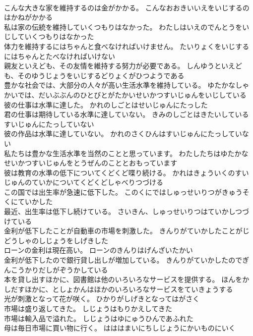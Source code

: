 \documentclass[8pt]{extreport}
\begin{document}
\begin{CJK}{UTF8}{min}
\\	こんな大きな家を維持するのは金がかかる。	こんなおおきいいえをいじするのはかねがかかる 
\\	私は家の伝統を維持していくつもりはなかった。	わたしはいえのでんとうをいじしていくつもりはなかった 
\\	体力を維持するにはちゃんと食べなければいけません。	たいりょくをいじするにはちゃんとたべなければいけない 
\\	親友といえども、その友情を維持する努力が必要である。	しんゆうといえども、そのゆうじょうをいじするどりょくがひつようである 
\\	豊かな社会では、大部分の人々が高い生活水準を維持している。	ゆたかなしゃかいでは、だいぶぶんのひとびとがたかいせいかつすいじゅんをいじしている 
\\	彼の仕事は水準に達した。	かれのしごとはせいじゅんにたっした 
\\	君の仕事は期待している水準に達していない。	きみのしごとはきたいしているすいじゅんにたっしていない 
\\	彼の作品は水準に達していない。	かれのさくひんはすいじゅんにたっしていない 
\\	私たちは豊かな生活水準を当然のことと思っています。	わたしたちはゆたかなせいかつすいじゅんをとうぜんのこととおもっています 
\\	彼は教育の水準の低下についてくどくど喋り続ける。	かれはきょういくのすいじゅんのていかについてくどくどしゃべりつづける 
\\	この国では出生率が急速に低下した。	このくにではしゅっせいりつがきゅうそくにていかした 
\\	最近、出生率は低下し続けている。	さいきん、しゅっせいりつはていかしつづけている 
\\	金利が低下したことが自動車の市場を刺激した。	きんりがていかしたことがじどうしゃのしじょうをしげきした 
\\	ローンの金利は現在高い。	ローンのきんりはげんざいたかい 
\\	金利が低下したので銀行貸し出しが増加している。	きんりがていかしたのでぎんこうかりだしがぞうかしている 
\\	本を貸し出すほかに、図書館は他のいろいろなサービスを提供する。	ほんをかしだすほかに、としょかんはほかのいろいろなサービスをていきょうする 
\\	光が刺激となって花が咲く。	ひかりがしげきとなってはがさく 
\\	市場は盛り返してきた。	しじょうはもりかえしてきた 
\\	市場は輸入品で溢れた。	しじょうはゆにゅうひんであふれた 
\\	母は毎日市場に買い物に行く。	はははまいにちしじょうにかいものにいく 

\end{CJK}
\end{document}
